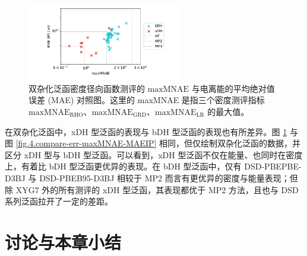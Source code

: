 \begin{figure}[t]
    \centering
    \includegraphics[width=0.6\textwidth]{assets/compare-err-maxMNAE-MAEIP-dh.pdf}
    \caption[双杂化泛函密度径向函数 $\text{maxMNAE}$ 与电离能的 MAE 对照图]{双杂化泛函密度径向函数测评的 $\text{maxMNAE}$ 与电离能的平均绝对值误差 (MAE) 对照图。这里的 maxMNAE 是指三个密度测评指标 $\text{maxMNAE}_\text{RHO}$、$\text{maxMNAE}_\text{GRD}$、$\text{maxMNAE}_\text{LR}$ 的最大值。}
    \label{fig.4.compare-err-maxMNAE-MAEIP-dh}
\end{figure}

在双杂化泛函中，xDH 型泛函的表现与 bDH 型泛函的表现也有所差异。图 \ref{fig.4.compare-err-maxMNAE-MAEIP-dh} 与图 \ref{fig.4.compare-err-maxMNAE-MAEIP} 相同，但仅绘制双杂化泛函的数据，并区分 xDH 型与 bDH 型泛函。可以看到，xDH 型泛函不仅在能量、也同时在密度上，有着比 bDH 型泛函更优异的表现。在 bDH 型泛函中，仅有 DSD-PBEPBE-D3BJ 与 DSD-PBEB95-D3BJ 相较于 MP2 而言有更优异的密度与能量表现；但除 XYG7 外的所有测评的 xDH 型泛函，其表现都优于 MP2 方法，且也与 DSD 系列泛函拉开了一定的差距。

\section{讨论与本章小结}

